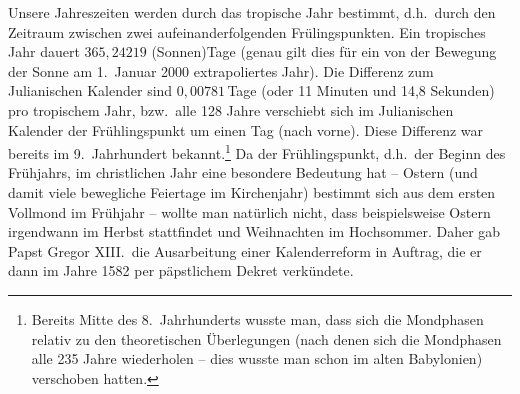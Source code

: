 Unsere Jahreszeiten werden durch das tropische Jahr bestimmt, d.h.\ durch den
Zeitraum zwischen zwei aufeinanderfolgenden Fr\"ulingspunkten.
Ein tropisches Jahr dauert $365,24219$ (Sonnen)\-Tage (genau gilt dies f\"ur ein von der Bewegung
der Sonne am 1.\ Januar 2000 extrapoliertes Jahr). Die Differenz zum Julianischen Kalender
sind $0,00781$\,Tage (oder 11 Minuten und 14,8 Sekunden) pro tropischem Jahr, bzw.\ alle 128 Jahre verschiebt sich
im Julianischen Kalender der Fr\"uhlingspunkt um einen Tag (nach vorne). Diese Differenz war
bereits im 9.\ Jahrhundert bekannt.\footnote{Bereits Mitte des 8.\ Jahrhunderts wusste man, dass
sich die Mondphasen relativ zu den theoretischen \"Uberlegungen (nach denen sich die
Mondphasen alle 235 Jahre wiederholen -- dies wusste man schon im alten Babylonien) 
verschoben hatten.} 
Da der Fr\"uhlingspunkt, d.h.\ der Beginn des Fr\"uhjahrs, 
im christlichen Jahr eine besondere Bedeutung hat -- Ostern (und damit viele bewegliche Feiertage
im Kirchenjahr) bestimmt sich aus dem ersten
Vollmond im Fr\"uhjahr -- wollte man nat\"urlich nicht, dass beispielsweise Ostern irgendwann
im Herbst stattfindet und Weihnachten im Hochsommer. Daher gab Papst Gregor XIII.\ die Ausarbeitung einer 
Kalenderreform in Auftrag, die er dann im Jahre 1582 per p\"apstlichem Dekret verk\"undete.


